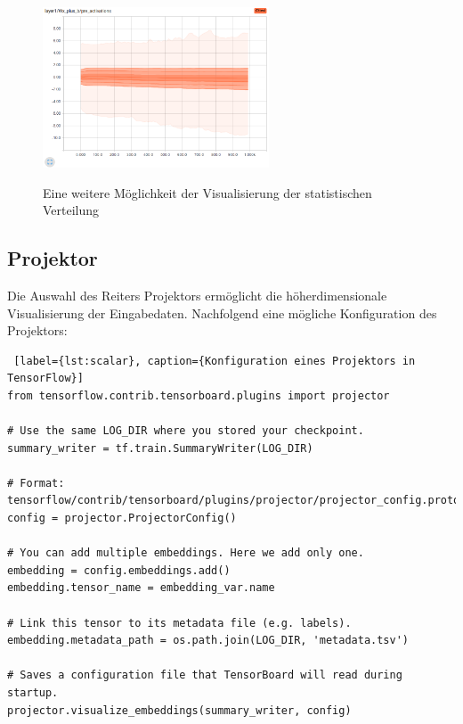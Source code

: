 \begin{figure}[h!]
	\centering
	 \includegraphics[width=0.6\textwidth]{images/Kapitel_3/distribution.png}\\
	\vspace{10pt} 
	\caption[Eine weitere Möglichkeit der Visualisierung der statistischen Verteilung]{Eine weitere Möglichkeit der Visualisierung der statistischen Verteilung}
	\label{fig:verteilung}
\end{figure}




\subsection{Projektor}


Die Auswahl des Reiters Projektors ermöglicht die höherdimensionale Visualisierung der Eingabedaten. Nachfolgend eine mögliche Konfiguration des Projektors:
\vspace{0.1cm}
\\

\begin{minipage}{\linewidth}
\begin{lstlisting} [label={lst:scalar}, caption={Konfiguration eines Projektors in TensorFlow}]
from tensorflow.contrib.tensorboard.plugins import projector

# Use the same LOG_DIR where you stored your checkpoint.
summary_writer = tf.train.SummaryWriter(LOG_DIR)

# Format: tensorflow/contrib/tensorboard/plugins/projector/projector_config.proto
config = projector.ProjectorConfig()

# You can add multiple embeddings. Here we add only one.
embedding = config.embeddings.add()
embedding.tensor_name = embedding_var.name

# Link this tensor to its metadata file (e.g. labels).
embedding.metadata_path = os.path.join(LOG_DIR, 'metadata.tsv')

# Saves a configuration file that TensorBoard will read during startup.
projector.visualize_embeddings(summary_writer, config)
\end{lstlisting}
\end{minipage}
\vspace{0.3cm}

